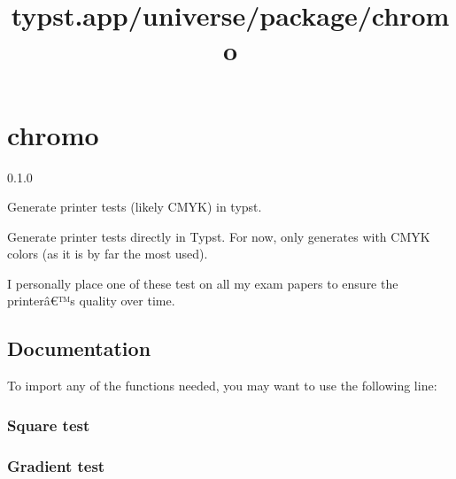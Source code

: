 \title{typst.app/universe/package/chromo}

\label{banner}
\section{chromo}\label{chromo}

{ 0.1.0 }

Generate printer tests (likely CMYK) in typst.

\label{readme}
Generate printer tests directly in Typst. For now, only generates with
CMYK colors (as it is by far the most used).

I personally place one of these test on all my exam papers to ensure the
printerâ€™s quality over time.

\subsection{Documentation}\label{documentation}

To import any of the functions needed, you may want to use the following
line:

\begin{Shaded}
\begin{Highlighting}[]
\end{Highlighting}
\end{Shaded}

\subsubsection{Square test}\label{square-test}

\begin{Shaded}
\begin{Highlighting}[]
\end{Highlighting}
\end{Shaded}

\subsubsection{Gradient test}\label{gradient-test}

\begin{Shaded}
\begin{Highlighting}[]
\end{Highlighting}
\end{Shaded}

